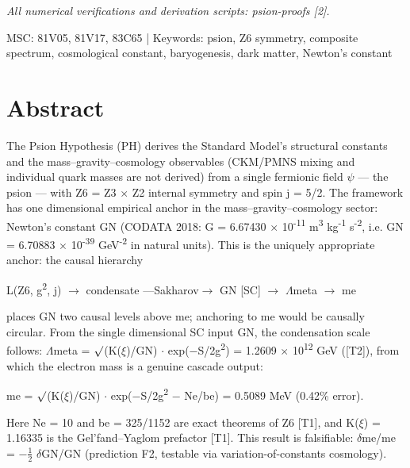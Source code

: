 \documentclass[11pt,letterpaper]{article}
\begin{document}
\begingroup\centering \small \textit{All numerical verifications and derivation scripts: psion-proofs [2].}\par\endgroup

\begingroup\centering \footnotesize MSC: 81V05, 81V17, 83C65  |  Keywords: psion, Z6 symmetry, composite spectrum, cosmological constant, baryogenesis, dark matter, Newton's constant\par\endgroup

\clearpage
\section*{Abstract}

\noindent The Psion Hypothesis (PH) derives the Standard Model's structural constants and the mass--gravity--cosmology observables (CKM/PMNS mixing and individual quark masses are not derived) from a single fermionic field $\psi$ --- the psion --- with Z6 = Z3 $\times$ Z2 internal symmetry and spin j = 5/2. The framework has one dimensional empirical anchor in the mass--gravity--cosmology sector: Newton's constant GN (CODATA 2018: G = 6.67430 $\times$ 10\textsuperscript{-11} m\textsuperscript{3} kg\textsuperscript{-1} s\textsuperscript{-2}, i.e. GN = 6.70883 $\times$ 10\textsuperscript{-39} GeV\textsuperscript{-2} in natural units). This is the uniquely appropriate anchor: the causal hierarchy

\begingroup\centering L(Z6, g\textsuperscript{2}, j)  $\to$  condensate  ---Sakharov$\to$  GN [SC]  $\to$  $\Lambda$meta  $\to$  me\par\endgroup

\noindent places GN two causal levels above me; anchoring to me would be causally circular. From the single dimensional SC input GN, the condensation scale follows: $\Lambda$meta = $\surd$(K($\xi$)/GN) $\cdot$ exp($-$S/2g\textsuperscript{2}) = 1.2609 $\times$ 10\textsuperscript{12} GeV ([T2]), from which the electron mass is a genuine cascade output:

\begingroup\centering me = $\surd$(K($\xi$)/GN) $\cdot$ exp($-$S/2g\textsuperscript{2} $-$ Ne/be) = 0.5089 MeV  (0.42\% error).\par\endgroup

\noindent Here Ne = 10 and be = 325/1152 are exact theorems of Z6 [T1], and K($\xi$) = 1.16335 is the Gel'fand--Yaglom prefactor [T1]. This result is falsifiable: $\delta$me/me = $-$$\tfrac{1}{2}$ $\delta$GN/GN (prediction F2, testable via variation-of-constants cosmology).
\end{document}
